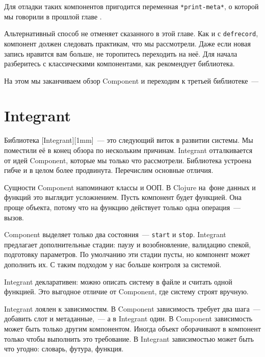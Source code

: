 \fi


\noindent
Для отладки таких компонентов пригодится переменная \verb|*print-meta*|, о
которой мы говорили в прошлой главе .

Альтернативный способ не отменяет сказанного в этой главе. Как и с
\verb|defrecord|, компонент должен следовать практикам, что мы рассмотрели. Даже
если новая запись нравится вам больше, не торопитесь переходить на неё. Для
начала разберитесь с классическими компонентами, как рекомендует библиотека.

На этом мы заканчиваем обзор Component и переходим к третьей библиотеке~---

\section{Integrant}


Библиотека [Integrant][1mm]~--- это
следующий виток в развитии системы. Мы поместили её в конец обзора по нескольким
причинам. Integrant отталкивается от идей Component, которые мы только что
рассмотрели. Библиотека устроена гибче и в целом более продвинута. Перечислим
основные отличия.


Сущности Component напоминают классы и ООП. В Clojure на~фоне данных и функций
это выглядит усложнением. Пусть компонент будет функцией. Она проще объекта,
потому что на функцию действует только одна операция~--- вызов.

Component выделяет только два состояния~--- \verb|start| и
\verb|stop|. Integrant предлагает дополнительные стадии: паузу и
возобновление, валидацию спекой, подготовку параметров. По умолчанию эти стадии
пусты, но компонент может дополнить их. С таким подходом у нас больше контроля
за системой.


Integrant декларативен: можно описать систему в файле и считать одной
функцией. Это выгодное отличие от Component, где систему строят вручную.

Integrant лоялен к зависимостям. В Component зависимость требует два шага~---
добавить слот и метаданные,~--- а в Integrant один. В Component зависимость
может быть только другим компонентом. Иногда объект оборачивают в компонент
только чтобы выполнить это требование. В Integrant зависимостью может быть что
угодно: словарь, футура, функция.

